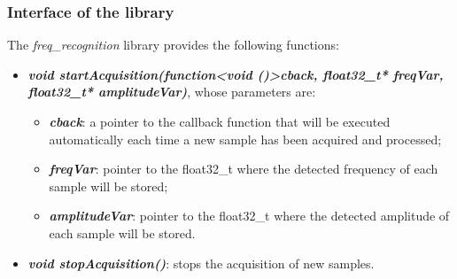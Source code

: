 \subsubsection{Interface of the library}
The \textit{freq\_recognition} library provides the following functions:
\begin{itemize}
	\item \textbf{\textit{void startAcquisition(function\textless void ()\textgreater cback, float32\_t* freqVar, float32\_t* amplitudeVar)}}, whose parameters are:
	\begin{itemize}
		\item \textbf{\textit{cback}}: a pointer to the callback function that will be executed automatically each time a new sample has been acquired and processed;
		\item \textbf{\textit{freqVar}}: pointer to the float32\_t where the detected frequency of each sample will be stored;
		\item \textbf{\textit{amplitudeVar}}: pointer to the float32\_t where the detected amplitude of each sample will be stored.
	\end{itemize}
\item \textbf{\textit{void stopAcquisition()}}: stops the acquisition of new samples.
\end{itemize}

